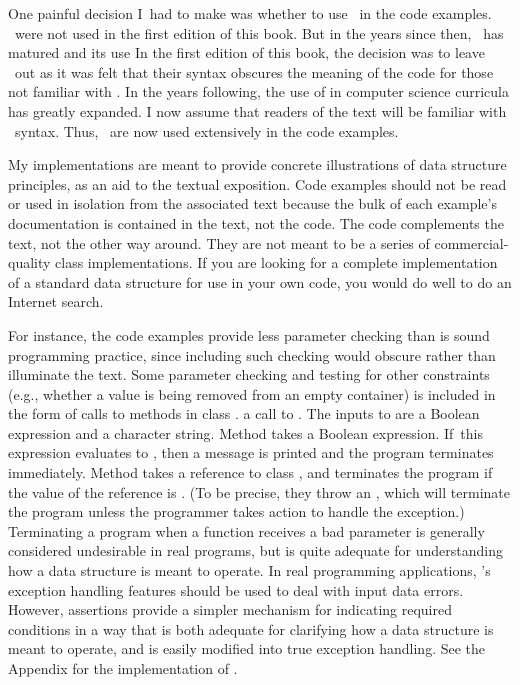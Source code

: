 One painful decision I~had to make was whether to use \Gens\
in the code examples.
{\GGens\ were not used in the first edition of this book.
But in the years since then, \Lang\ has matured and its use}{}
{In the first edition of this book, the decision was to leave \Gens\
out as it was felt that their syntax
obscures the meaning of the code for those not familiar with
\Lang.\index{templates}
In the years following, the use of \Lang}{}
in computer science curricula has greatly expanded.
I now assume that readers of the text will be
familiar with \Gen\ syntax.
Thus, \Gens\ are now used extensively in the code examples.

My implementations are meant to provide concrete illustrations of data
structure principles, as an aid to the textual exposition.
Code examples should not be read or used in isolation from the
associated text because the bulk of each example's documentation is
contained in the text, not the code.
The code complements the text, not the other way around.
They are not meant to be a series of commercial-quality class
implementations.
If you are looking for a complete implementation of a standard data
structure for use in your own code, you would do well to do an
Internet search.

For instance, the code examples provide less parameter checking than is
sound programming practice, since including such checking would
obscure rather than illuminate the text.
Some parameter checking and testing for other constraints
(e.g., whether a value is being removed from an empty container)
is included in the form
of\ifthenelse{\boolean{java}}
{calls to methods in class .}{}
{a call to .}{}
\ifthenelse{\boolean{cpp}}
{The inputs to \Cref{Assert} are a Boolean expression and a character
string.}{}
\ifthenelse{\boolean{java}}
{Method  takes a Boolean expression.}{}
If~this expression evaluates to \FALSE, then a message is printed and
the program terminates immediately.
\ifthenelse{\boolean{java}}
{Method  takes a reference to class ,
and terminates the program if the value of the reference is \NULL.
(To be precise, they throw an
\Cref{IllegalArgument\-Exception}, which will
terminate the program unless the programmer takes action to handle
the exception.)}{}
Terminating a program when a function receives a bad parameter is
generally considered undesirable in real programs,
but is quite adequate for understanding how a data structure is
meant to operate.
In real programming applications, \Lang's exception handling features
should be used to deal with input data errors.
However, assertions provide a simpler mechanism for indicating
required conditions in a way that is both adequate for clarifying how
a data structure is meant to operate, and is easily modified into true
exception handling.
\ifthenelse{\boolean{cpp}}
{See the Appendix for the implementation of .}{}

